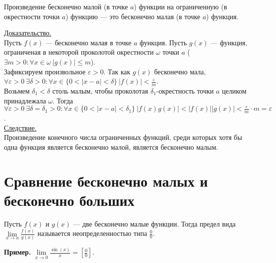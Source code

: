 \documentclass{article}
\begin{document}
\begin{theorem}
    Произведение бесконечно малой (в точке \(a\)) функции на ограниченную (в окрестности точки \(a\)) функцию --- это бесконечно малая (в точке \(a\)) функция.
\end{theorem}
\noindent
\underline{Доказательство.}\\[0.1cm]
Пусть \(f(x)\) --- бесконечно малая в точке \(a\) функция. Пусть \(g(x)\) --- функция, ограниченая в некоторой проколотой окрестности \(\omega\) точки \(a\) (\(\displaystyle \exists m > 0 : \forall x \in \omega\ \vert g(x) \vert \leq m\)).\\
Зафиксируем произвольное \(\displaystyle \varepsilon > 0\). Так как \(g(x)\) бесконечно мала, \(\displaystyle \forall \varepsilon > 0\ \exists \delta > 0: \forall x \in \{0 < \vert x - a \vert < \delta\}\ \vert f(x) \vert < \frac{\varepsilon}{m}\).\\
Возьмем \(\delta_{1} < \delta \) столь малым, чтобы проколотая \(\delta_{1}\)-окрестность точки \(a\) целиком принадлежала \(\omega \).
Тогда \(\displaystyle \forall \varepsilon > 0\ \exists \delta = \delta_{1} > 0: \forall x \in \{0 < \vert x - a \vert < \delta_{1}\}\ \vert f(x)g(x) \vert < \vert f(x) \vert \vert g(x) \vert < \frac{\varepsilon}{m} \cdot m = \varepsilon\).\\[0.1cm]
\underline{Следствие.}\\[0.1cm]
Произведение конечного числа ограниченных функций, среди которых хотя бы одна функция является бесконечно малой, является бесконечно малым.

\section{Сравнение бесконечно малых и бесконечно больших}
\begin{definition}
    Пусть \(f(x)\) и \(g(x)\) --- две бесконечно малые функции. Тогда предел вида \(\displaystyle \lim\limits_{x \to a} \frac{f(x)}{g(x)}\) называется неопределенностью типа \(\displaystyle \frac{0}{0}\).    
\end{definition}
\noindent
\textbf{Пример.} \(\displaystyle \lim\limits_{x \to 0} \frac{\sin(x)}{x} = \left[\frac{0}{0}\right]\).
\end{document}
